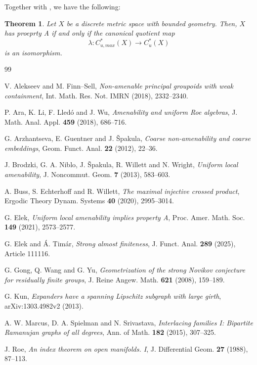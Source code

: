 \documentclass[11pt,a4paper]{article}
\newtheorem{theorem}{Theorem}[section]
\theoremstyle{definition}\newtheorem{definition}[theorem]{Definition}
\theoremstyle{remark}\newtheorem{remark}[theorem]{Remark}
\begin{document}
Together with \cite[Proposition 1.3]{SW}, we have the following:
\begin{theorem}
Let $X$ be a discrete metric space with bounded geometry. Then, $X$ has proeprty A if and only if the canonical quotient map 
$$
\lambda: C^*_{u,max}(X)\to C^*_u(X)
$$
is an isomorphism. 	
\end{theorem}

\begin{thebibliography}{99}

V. Alekseev and M. Finn--Sell,
\emph{Non-amenable principal groupoids with weak containment},
Int. Math. Res. Not. IMRN (2018), 2332--2340.

P. Ara, K. Li, F. Lled\'o and J. Wu,
\emph{Amenability and uniform Roe algebras},
J. Math. Anal. Appl. \textbf{459} (2018), 686--716.

G. Arzhantseva, E. Guentner and J. \v{S}pakula,
\emph{Coarse non-amenability and coarse embeddings},
Geom. Funct. Anal. \textbf{22} (2012), 22--36.

J. Brodzki, G. A. Niblo, J. \v{S}pakula, R. Willett and N. Wright,
\emph{Uniform local amenability},
J. Noncommut. Geom. \textbf{7} (2013), 583--603.

A. Buss, S. Echterhoff and R. Willett,
\emph{The maximal injective crossed product},
Ergodic Theory Dynam. Systems \textbf{40} (2020), 2995--3014.

G. Elek,
\emph{Uniform local amenability implies property A},
Proc. Amer. Math. Soc. \textbf{149} (2021), 2573--2577.

G. Elek and \'{A}. Tim\'{a}r,
\emph{Strong almost finiteness},
J. Funct. Anal. \textbf{289} (2025), Article 111116.

G. Gong, Q. Wang and G. Yu,
\emph{Geometrization of the strong Novikov conjecture for residually finite groups},
J. Reine Angew. Math. \textbf{621} (2008), 159--189.

G. Kun, \emph{Expanders have a spanning Lipschitz subgraph with large girth},
arXiv:1303.4982v2 (2013).

A. W. Marcus, D. A. Spielman and N. Srivastava,
\emph{Interlacing families I: Bipartite Ramanujan graphs of all degrees},
Ann. of Math. \textbf{182} (2015), 307--325.

J. Roe,
\emph{An index theorem on open manifolds. I},
J. Differential Geom. \textbf{27} (1988), 87--113.


\end{thebibliography}
\end{document}

